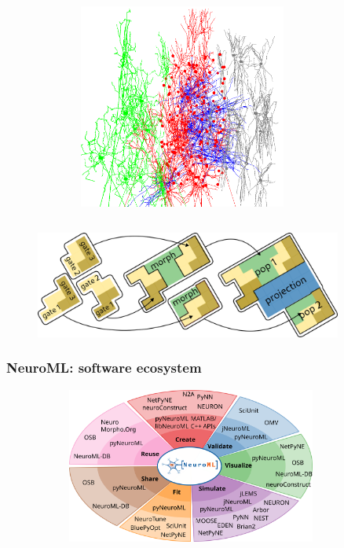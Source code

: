\begin{frame}[c]
\begin{columns}
\begin{column}{0.3\textwidth}
\begin{figure}[h]
      \end{figure}%
    \end{column}
    \begin{column}{0.3\textwidth}
      \begin{figure}[h]
        \centering
        \includegraphics[width=0.7\textwidth]{99_images/20231004-HL23Net}
      \end{figure}%
    \end{column}
  \end{columns}
  \begin{figure}[h]
    \centering
    \includegraphics[width=0.9\textwidth]{99_images/lego}
  \end{figure}%
\end{frame}
\begin{frame}[c]
  \frametitle{NeuroML: software ecosystem}
\begin{figure}[t]
  \begin{figure}[h]
    \centering
    \includegraphics[width=0.9\textwidth]{99_images/ecosystem-onion}
  \end{figure}%
\end{figure}
\end{frame}
